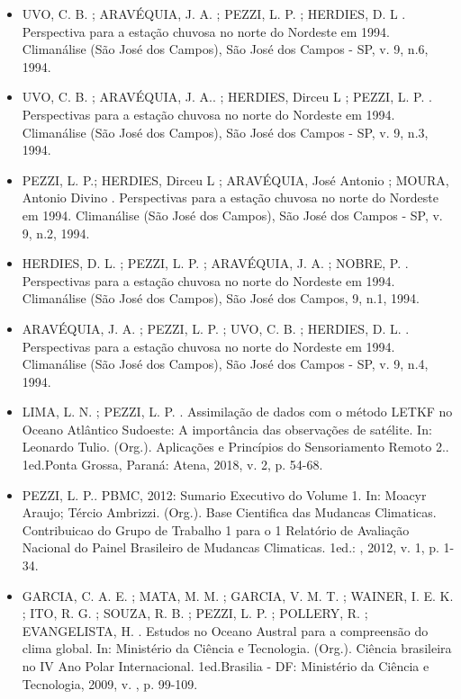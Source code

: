 \documentclass[11pt, a4paper]{awesome-cv}
\begin{document}
\begin{cvletter}
\begin{itemize}
  \item[] UVO, C. B. ; ARAVÉQUIA, J. A. ; PEZZI, L. P. ; HERDIES, D. L . 
  Perspectiva para a estação chuvosa no norte do Nordeste em 1994. Climanálise (São José dos Campos), 
  São José dos Campos - SP, v. 9, n.6, 1994. 

  \item[] UVO, C. B. ; ARAVÉQUIA, J. A.. ; HERDIES, Dirceu L ; PEZZI, L. P. . 
  Perspectivas para a estação chuvosa no norte do Nordeste em 1994. Climanálise (São José dos Campos), 
  São José dos Campos - SP, v. 9, n.3, 1994. 

  \item[] 
  PEZZI, L. P.; HERDIES, Dirceu L ; ARAVÉQUIA, José Antonio ; MOURA, Antonio Divino . 
  Perspectivas para a estação chuvosa no norte do Nordeste em 1994. Climanálise (São José dos Campos), 
  São José dos Campos - SP, v. 9, n.2, 1994. 

  \item[] 
  HERDIES, D. L. ; PEZZI, L. P. ; ARAVÉQUIA, J. A. ; NOBRE, P. . Perspectivas para a 
  estação chuvosa no norte do Nordeste em 1994. Climanálise (São José dos Campos), São José dos Campos, 
   9, n.1, 1994. 

  \item[] 
  ARAVÉQUIA, J. A. ; PEZZI, L. P. ; UVO, C. B. ; HERDIES, D. L. . Perspectivas 
  para a estação chuvosa no norte do Nordeste em 1994. Climanálise (São José dos Campos), 
  São José dos Campos - SP, v. 9, n.4, 1994. 
\end{itemize}


\begin{itemize}
  \item[] LIMA, L. N. ; PEZZI, L. P. . Assimilação de dados com o método LETKF no Oceano Atlântico 
  Sudoeste: A importância das observações de satélite. In: Leonardo Tulio. (Org.). Aplicações e
  Princípios do Sensoriamento Remoto 2.. 1ed.Ponta Grossa, Paraná: Atena, 2018, v. 2, p. 54-68. 

  \item[] PEZZI, L. P.. PBMC, 2012: Sumario Executivo do Volume 1. In: Moacyr Araujo; 
  Tércio Ambrizzi. (Org.). Base Cientifica das Mudancas Climaticas. Contribuicao do Grupo de 
  Trabalho 1 para o 1 Relatório de Avaliação Nacional do Painel Brasileiro de Mudancas Climaticas. 
  1ed.: , 2012, v. 1, p. 1-34. 

  \item[] GARCIA, C. A. E. ; MATA, M. M. ; GARCIA, V. M. T. ; WAINER, I. E. K. ; 
  ITO, R. G. ; SOUZA, R. B. ; PEZZI, L. P. ; POLLERY, R. ; EVANGELISTA, H. . Estudos no 
  Oceano Austral para a compreensão do clima global. In: Ministério da Ciência e Tecnologia. 
  (Org.). Ciência brasileira no IV Ano Polar Internacional. 1ed.Brasilia - DF: Ministério da 
  Ciência e Tecnologia, 2009, v. , p. 99-109. 


\end{itemize}
\end{cvletter}
\end{document}
